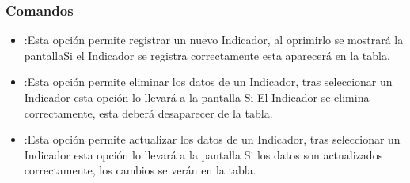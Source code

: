 \subsubsection{Comandos}
\begin{itemize}
 \item {}:Esta opción permite registrar un nuevo Indicador, al oprimirlo se mostrará la pantallaSi el Indicador se registra correctamente esta aparecerá en la tabla.

 \item {}:Esta opción permite eliminar los datos de un Indicador, tras seleccionar un Indicador esta opción lo llevará a la pantalla Si El Indicador se elimina correctamente, esta deberá desaparecer de la tabla.

 \item {}:Esta opción permite actualizar los datos de un Indicador, tras seleccionar un Indicador esta opción lo llevará a la pantalla Si los datos son actualizados correctamente, los cambios se verán en la tabla.

\end{itemize}